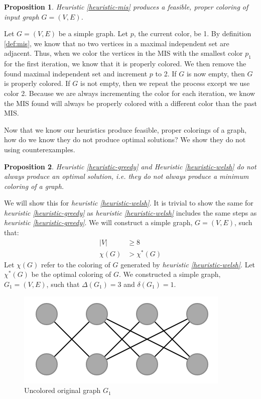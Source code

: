 \documentclass{article}
\newcounter{heuristic} \setcounter{heuristic}{0}
\newtheorem{prop}{Proposition}
\theoremstyle{definition}
\begin{document}
\begin{prop}
Heuristic \ref{heuristic-mis} produces a feasible, proper coloring of input graph \(G = (V, E)\).
\end{prop}

Let \(G = (V, E)\) be a simple graph. Let $p$, the current color, be 1. By definition \ref{def:mis}, we know that no two vertices in a maximal independent set are adjacent. Thus, when we color the vertices in the MIS with the smallest color \(p_1\) for the first iteration, we know that it is properly colored. We then remove the found maximal independent set and increment $p$ to 2. If $G$ is now empty, then $G$ is properly colored. If $G$ is not empty, then we repeat the process except we use color 2. Because we are always incrementing the color for each iteration, we know the MIS found will always be properly colored with a different color than the past MIS.

Now that we know our heuristics produce feasible, proper colorings of a graph, how do we know they do not produce optimal solutions? We show they do not using counterexamples.

\begin{prop}
Heuristic \ref{heuristic-greedy} and Heuristic \ref{heuristic-welsh} do not always produce an optimal solution, i.e. they do not always produce a minimum coloring of a graph.
\end{prop}

We will show this for \emph{heuristic \ref{heuristic-welsh}}. It is trivial to show the same for \emph{heuristic \ref{heuristic-greedy}} as \emph{heuristic \ref{heuristic-welsh}} includes the same steps as \emph{heuristic \ref{heuristic-greedy}}. We will construct a simple graph, \(G = (V, E)\), such that:
%
\begin{align}
|V| &\geq 8 \\
\chi(G) &> \chi^{*}(G)
\end{align}
%
Let \(\chi(G)\) refer to the coloring of \(G\) generated by \emph{heuristic \ref{heuristic-welsh}}. Let \(\chi^{*}(G)\) be the optimal coloring of \(G\). We constructed a simple graph, \(G_1 = (V, E)\), such that \(\Delta(G_1) = 3\) and \(\delta(G_1) = 1\).

\begin{figure}[H]
\centering
\includegraphics[scale=0.5]{images/graph-1.png}
\caption{Uncolored original graph \(G_1\)}
\end{figure}
\end{document}
